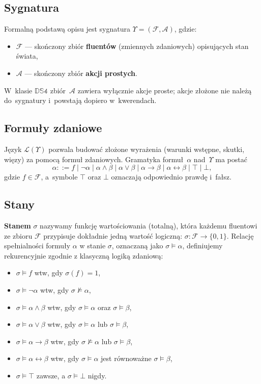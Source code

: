 \documentclass[11pt,a4paper]{article}
\theoremstyle{definition}
\begin{document}
\subsection{Sygnatura}
Formalną podstawą opisu jest sygnatura $\Upsilon = (\mathcal{F}, \mathcal{A})$, gdzie:
\begin{itemize}
  \item $\mathcal{F}$ --- skończony zbiór \textbf{fluentów} (zmiennych zdaniowych) opisujących stan świata,
  \item $\mathcal{A}$ --- skończony zbiór \textbf{akcji prostych}.
\end{itemize}
W~klasie $\mathbb{DS4}$ zbiór~$\mathcal{A}$ zawiera wyłącznie akcje proste; akcje złożone nie należą do~sygnatury i~powstają dopiero w~kwerendach.

\subsection{Formuły zdaniowe}

Język $\mathcal{L}(\Upsilon)$ pozwala budować złożone wyrażenia (warunki wstępne, skutki, więzy) za pomocą formuł zdaniowych. Gramatyka formuł~$\alpha$ nad~$\Upsilon$ ma postać
$$\alpha ::= f \mid \neg\alpha \mid \alpha \land \beta \mid \alpha \lor \beta \mid \alpha \to \beta \mid \alpha \leftrightarrow \beta \mid \top \mid \bot,$$
gdzie $f \in \mathcal{F}$, a~symbole $\top$ oraz $\bot$ oznaczają odpowiednio prawdę i~fałsz.

\subsection{Stany}

\textbf{Stanem} $\sigma$ nazywamy funkcję wartościowania (totalną), która każdemu fluentowi ze zbioru $\mathcal{F}$ przypisuje dokładnie jedną wartość logiczną: $\sigma\colon \mathcal{F} \to \{0,1\}$.
Relację spełnialności formuły $\alpha$ w stanie $\sigma$, oznaczaną jako $\sigma \models \alpha$, definiujemy rekurencyjnie zgodnie z klasyczną logiką zdaniową:
\begin{itemize}
\item $\sigma \models f$ wtw, gdy $\sigma(f) = 1$,
\item $\sigma \models \neg\alpha$ wtw, gdy $\sigma \not\models \alpha$,
\item $\sigma \models \alpha \land \beta$ wtw, gdy $\sigma \models \alpha$ oraz $\sigma \models \beta$,
\item $\sigma \models \alpha \lor \beta$ wtw, gdy $\sigma \models \alpha$ lub $\sigma \models \beta$,
\item $\sigma \models \alpha \to \beta$ wtw, gdy $\sigma \not\models \alpha$ lub $\sigma \models \beta$,
\item $\sigma \models \alpha \leftrightarrow \beta$ wtw, gdy $\sigma \models \alpha$ jest równoważne $\sigma \models \beta$,
\item $\sigma \models \top$ zawsze, a $\sigma \models \bot$ nigdy.
\end{itemize}
\end{document}
